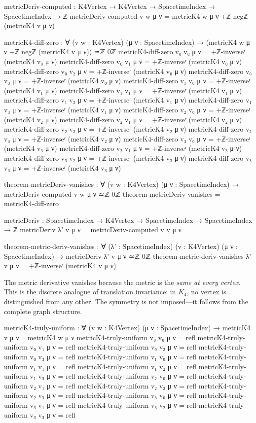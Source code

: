\documentclass[11pt,a4paper]{book}
\begin{document}
\begin{code}
metricDeriv-computed : K4Vertex → K4Vertex → SpacetimeIndex → SpacetimeIndex → ℤ
metricDeriv-computed v w μ ν = metricK4 w μ ν +ℤ negℤ (metricK4 v μ ν)

metricK4-diff-zero : ∀ (v w : K4Vertex) (μ ν : SpacetimeIndex) →
  (metricK4 w μ ν +ℤ negℤ (metricK4 v μ ν)) ≃ℤ 0ℤ
metricK4-diff-zero v₀ v₀ μ ν = +ℤ-inverseʳ (metricK4 v₀ μ ν)
metricK4-diff-zero v₀ v₁ μ ν = +ℤ-inverseʳ (metricK4 v₀ μ ν)
metricK4-diff-zero v₀ v₂ μ ν = +ℤ-inverseʳ (metricK4 v₀ μ ν)
metricK4-diff-zero v₀ v₃ μ ν = +ℤ-inverseʳ (metricK4 v₀ μ ν)
metricK4-diff-zero v₁ v₀ μ ν = +ℤ-inverseʳ (metricK4 v₁ μ ν)
metricK4-diff-zero v₁ v₁ μ ν = +ℤ-inverseʳ (metricK4 v₁ μ ν)
metricK4-diff-zero v₁ v₂ μ ν = +ℤ-inverseʳ (metricK4 v₁ μ ν)
metricK4-diff-zero v₁ v₃ μ ν = +ℤ-inverseʳ (metricK4 v₁ μ ν)
metricK4-diff-zero v₂ v₀ μ ν = +ℤ-inverseʳ (metricK4 v₂ μ ν)
metricK4-diff-zero v₂ v₁ μ ν = +ℤ-inverseʳ (metricK4 v₂ μ ν)
metricK4-diff-zero v₂ v₂ μ ν = +ℤ-inverseʳ (metricK4 v₂ μ ν)
metricK4-diff-zero v₂ v₃ μ ν = +ℤ-inverseʳ (metricK4 v₂ μ ν)
metricK4-diff-zero v₃ v₀ μ ν = +ℤ-inverseʳ (metricK4 v₃ μ ν)
metricK4-diff-zero v₃ v₁ μ ν = +ℤ-inverseʳ (metricK4 v₃ μ ν)
metricK4-diff-zero v₃ v₂ μ ν = +ℤ-inverseʳ (metricK4 v₃ μ ν)
metricK4-diff-zero v₃ v₃ μ ν = +ℤ-inverseʳ (metricK4 v₃ μ ν)

theorem-metricDeriv-vanishes : ∀ (v w : K4Vertex) (μ ν : SpacetimeIndex) →
                                metricDeriv-computed v w μ ν ≃ℤ 0ℤ
theorem-metricDeriv-vanishes = metricK4-diff-zero

metricDeriv : SpacetimeIndex → K4Vertex → SpacetimeIndex → SpacetimeIndex → ℤ
metricDeriv λ' v μ ν = metricDeriv-computed v v μ ν

theorem-metric-deriv-vanishes : ∀ (λ' : SpacetimeIndex) (v : K4Vertex) 
                                  (μ ν : SpacetimeIndex) →
                                metricDeriv λ' v μ ν ≃ℤ 0ℤ
theorem-metric-deriv-vanishes λ' v μ ν = +ℤ-inverseʳ (metricK4 v μ ν)
\end{code}

The metric derivative vanishes because the metric is the \emph{same at every vertex}. This is the discrete analogue of translation invariance: in $K_4$, no vertex is distinguished from any other. The symmetry is not imposed---it follows from the complete graph structure.

\begin{code}
metricK4-truly-uniform : ∀ (v w : K4Vertex) (μ ν : SpacetimeIndex) →
  metricK4 v μ ν ≡ metricK4 w μ ν
metricK4-truly-uniform v₀ v₀ μ ν = refl
metricK4-truly-uniform v₀ v₁ μ ν = refl
metricK4-truly-uniform v₀ v₂ μ ν = refl
metricK4-truly-uniform v₀ v₃ μ ν = refl
metricK4-truly-uniform v₁ v₀ μ ν = refl
metricK4-truly-uniform v₁ v₁ μ ν = refl
metricK4-truly-uniform v₁ v₂ μ ν = refl
metricK4-truly-uniform v₁ v₃ μ ν = refl
metricK4-truly-uniform v₂ v₀ μ ν = refl
metricK4-truly-uniform v₂ v₁ μ ν = refl
metricK4-truly-uniform v₂ v₂ μ ν = refl
metricK4-truly-uniform v₂ v₃ μ ν = refl
metricK4-truly-uniform v₃ v₀ μ ν = refl
metricK4-truly-uniform v₃ v₁ μ ν = refl
metricK4-truly-uniform v₃ v₂ μ ν = refl
metricK4-truly-uniform v₃ v₃ μ ν = refl
\end{code}
\end{document}
